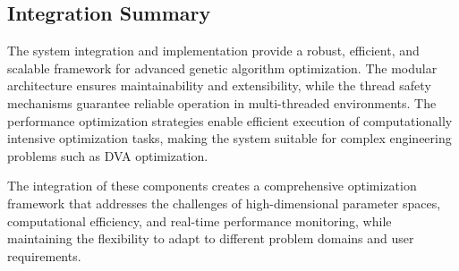 \documentclass[12pt,a4paper]{article}
\begin{document}
\subsection{Integration Summary}

The system integration and implementation provide a robust, efficient, and scalable framework for advanced genetic algorithm optimization. The modular architecture ensures maintainability and extensibility, while the thread safety mechanisms guarantee reliable operation in multi-threaded environments. The performance optimization strategies enable efficient execution of computationally intensive optimization tasks, making the system suitable for complex engineering problems such as DVA optimization.

The integration of these components creates a comprehensive optimization framework that addresses the challenges of high-dimensional parameter spaces, computational efficiency, and real-time performance monitoring, while maintaining the flexibility to adapt to different problem domains and user requirements.
\end{document}
